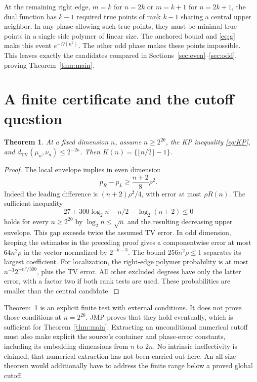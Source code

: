 \documentclass[11pt]{article}
\newtheorem{theorem}{Theorem}[section]
\theoremstyle{remark}\newtheorem{remark}[theorem]{Remark}
\newcommand{\TV}{d_{\mathrm{TV}}}
\begin{document}
At the remaining right edge, $m=k$ for $n=2k$ or $m=k+1$ for $n=2k+1$,
the dual function has $k-1$ required true points of rank $k-1$ sharing
a central upper neighbor. In any phase allowing such true points, they
must be minimal true points in a single side polymer of linear size.
The anchored bound and \eqref{eq:g} make this event
$e^{-\Omega(n^2)}$. The other odd phase makes these points impossible.
This leaves exactly the candidates compared in
Sections~\ref{sec:even}--\ref{sec:odd}, proving Theorem~\ref{thm:main}.

\section{A finite certificate and the cutoff question}\label{sec:cutoff}
\begin{theorem}\label{thm:certificate}
At a fixed dimension $n$, assume $n\ge2^{20}$, the KP inequality
\eqref{eq:KP}, and $\TV(\mu_n,\nu_n)\le2^{-2n}$.
Then $K(n)=\{\lfloor n/2\rfloor-1\}$.
\end{theorem}
\begin{proof}
The local envelope implies in even dimension
\[
 p_R-p_L\ge\frac{n+2}{8}\rho^2.
\]
Indeed the leading difference is $(n+2)\rho^2/4$, with error at most
$\rho R(n)$. The sufficient inequality
\[
 27+300\log_2n-n/2-\log_2(n+2)\le0
\]
holds for every $n\ge2^{20}$ by $\log_2n\le\sqrt n$ and the resulting
decreasing upper envelope. This gap exceeds twice the assumed TV error.
In odd dimension, keeping the estimates in the preceding proof gives a
componentwise error at most $64n^2\rho$ in the vector normalized by
$2^{-k-3}$. The bound $256n^2\rho\le1$ separates its largest coefficient.
For localization, the right-edge polymer probability is at most
$n^{-3}2^{-n^2/300}$, plus the TV error. All other excluded degrees have
only the latter error, with a factor two if both rank tests are used.
These probabilities are smaller than the central candidate.
\end{proof}

Theorem~\ref{thm:certificate} is an explicit finite test with external
conditions. It does not prove those conditions at $n=2^{20}$.
JMP proves that they hold eventually, which is sufficient for
Theorem~\ref{thm:main}. Extracting an unconditional numerical cutoff must
also make explicit the source's container and phase-error constants,
including its embedding dimensions from $n$ to $2n$. No intrinsic
ineffectivity is claimed; that numerical extraction has not been carried
out here. An all-size theorem would additionally have to address the
finite range below a proved global cutoff.
\end{document}
